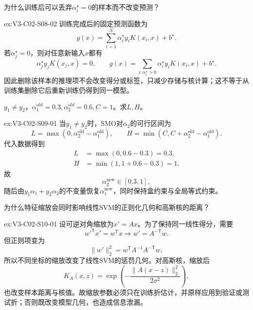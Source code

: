 \begin{SLChapterExercisePairSection}
\begin{exercise}\label{ex:V3-C02-S08-02}
为什么训练后可以丢弃$\alpha_i^\star=0$的样本而不改变预测？
\end{exercise}
\ifSLFullEdition
{}\label{sol:V3-C02-S08-02}
\begin{chapterexercisesolution}{ex:V3-C02-S08-02}
训练完成后的固定预测函数为
\[
g(x)=\sum_{i=1}^{N}\alpha_i^\star y_iK(x_i,x)+b^\star.
\]
若$\alpha_j^\star=0$，则对任意新输入$x$都有
\[
\alpha_j^\star y_jK(x_j,x)=0,
\qquad
g(x)=\sum_{i:\alpha_i^\star>0}\alpha_i^\star y_iK(x_i,x)+b^\star.
\]
因此删除该样本的推理项不会改变得分或标签，只减少存储与核计算；这不等于从训练集删除它后重新训练仍得到同一模型。
\end{chapterexercisesolution}
\fi

\begin{exercise}\label{ex:V3-C02-S09-01}
$y_1\neq y_2$，$\alpha_1^{old}=0.3,\alpha_2^{old}=0.6,C=1$。求$L,H$。
\end{exercise}
\ifSLFullEdition
{}\label{sol:V3-C02-S09-01}
\begin{chapterexercisesolution}{ex:V3-C02-S09-01}
当$y_1\neq y_2$时，SMO对$\alpha_2$的可行区间为
\[
L=\max(0,\alpha_2^{\mathrm{old}}-\alpha_1^{\mathrm{old}}),
\qquad
H=\min(C,C+\alpha_2^{\mathrm{old}}-\alpha_1^{\mathrm{old}}).
\]
代入数据得到
\[
\begin{aligned}
L&=\max(0,0.6-0.3)=0.3,\\
H&=\min(1,1+0.6-0.3)=1.
\end{aligned}
\]
故
\[
\alpha_2^{\mathrm{new}}\in[0.3,1],
\]
随后由$y_1\alpha_1+y_2\alpha_2$的不变量恢复$\alpha_1^{\mathrm{new}}$，同时保持盒约束与全局等式约束。
\end{chapterexercisesolution}
\fi

\begin{exercise}\label{ex:V3-C02-S10-01}
为什么特征缩放会同时影响线性SVM的正则化几何和高斯核的距离？
\end{exercise}
\ifSLFullEdition
{}\label{sol:V3-C02-S10-01}
\begin{chapterexercisesolution}{ex:V3-C02-S10-01}
设可逆对角缩放为$x'=Ax$。为了保持同一线性得分，需要
\[
w'^{\mathsf T}x'=w^{\mathsf T}x
\Longrightarrow w'=A^{-\mathsf T}w.
\]
但正则项变为
\[
\lVert w'\rVert_2^2
=w^{\mathsf T}A^{-1}A^{-\mathsf T}w,
\]
所以不同坐标的缩放改变了线性SVM的惩罚几何。对高斯核，缩放后
\[
K_A(x,z)=\exp\!\left(-\frac{\lVert A(x-z)\rVert_2^2}{2\sigma^2}\right),
\]
也改变样本距离与核值。故缩放参数必须只在训练折估计，并原样应用到验证或测试折；否则既改变模型几何，也造成信息泄漏。
\end{chapterexercisesolution}
\fi

\end{SLChapterExercisePairSection}

